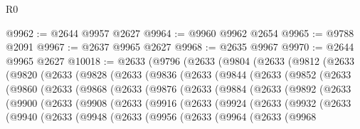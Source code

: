 \begin{lexlean}{R0}
\begin{coremodule}
@9962 := @2644 @9957 @2627
@9964 := @9960 @9962 @2654
@9965 := @9788 @2091
@9967 := @2637 @9965 @2627
@9968 := @2635 @9967
@9970 := @2644 @9965 @2627
@10018 := @2633
    (@9796
      (@2633
        (@9804
          (@2633
            (@9812
              (@2633
                (@9820
                  (@2633
                    (@9828
                      (@2633
                        (@9836
                          (@2633
                            (@9844
                              (@2633
                                (@9852
                                  (@2633
                                    (@9860
                                      (@2633
                                        (@9868
                                          (@2633
                                            (@9876
                                              (@2633
                                                (@9884
                                                  (@2633
                                                    (@9892
                                                      (@2633
                                                        (@9900
                                                          (@2633
                                                            (@9908
                                                              (@2633
                                                                (@9916
                                                                  (@2633
                                                                    (@9924
                                                                      (@2633
                                                                        (@9932
                                                                          (@2633
                                                                            (@9940
                                                                              (@2633
                                                                                (@9948
                                                                                  (@2633
                                                                                    (@9956
                                                                                      (@2633
                                                                                        (@9964
                                                                                          (@2633
                                                                                            (@9968

\end{coremodule}
\end{lexlean}
